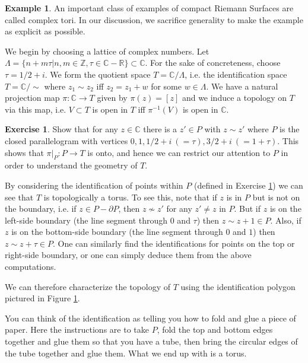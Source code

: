 \documentclass[12pt]{book}%
\theoremstyle{plain}
\theoremstyle{definition}
\newtheorem{example}[theorem]{Example}
\newtheorem{exercise}{Exercise}
\theoremstyle{remark}
\def\to{\rightarrow}
\def\bC{{\mathbb{C}}}
\def\bR{{\mathbb{R}}}
\def\bZ{{\mathbb{Z}}}
\newcommand{\del}{\partial}
\begin{document}
\begin{example}
An important class of examples of compact Riemann Surfaces are called complex tori. In our discussion, we sacrifice generality to make the example as explicit as possible.

We begin by choosing a lattice of complex numbers. Let $\Lambda = \{n+m\tau | n,m \in \bZ, \tau \in \bC-\bR\} \subset \bC$. For the sake of concreteness, choose $\tau = 1/2+i$. We form the quotient space $T=\bC/\Lambda$, i.e. the identification space $T=\bC/\sim$ where $z_1 \sim z_2$ iff $z_2 = z_1 + w$ for some $w\in\Lambda$. We have a natural projection map $\pi:\bC \to T$ given by $\pi(z)=[z]$ and we induce a topology on $T$ via this map, i.e. $V\subset T$ is open in $T$ iff $\pi^{-1}(V)$ is open in $\bC$.

\begin{exercise}
\label{fundamentalRegion}
Show that for any $z\in\bC$ there is a $z'\in P$ with $z \sim z'$ where $P$ is the closed parallelogram with vertices $0, 1, 1/2+i\ (= \tau), 3/2+i\ (= 1 + \tau)$. This shows that $\pi|_P:P \to T$ is onto, and hence we can restrict our attention to $P$ in order to understand the geometry of $T$.
\end{exercise}

By considering the identification of points within $P$ (defined in Exercise \ref{fundamentalRegion}) we can see that $T$ is topologically a torus. To see this, note that if $z$ is in $P$ but is not on the boundary, i.e. if $z\in P-\del P$, then $z \nsim z'$ for any $z'\neq z$ in $P$. But if $z$ is on the left-side boundary (the line segment through $0$ and $\tau$) then $z \sim z+1\in P$. Also, if $z$ is on the bottom-side boundary (the line segment through $0$ and $1$) then $z \sim z+\tau \in P$. One can similarly find the identifications for points on the top or right-side boundary, or one can simply deduce them from the above computations.

We can therefore characterize the topology of $T$ using the  identification polygon pictured in Figure \ref{identPolygonForTorus}.

\begin{figure}
\label{identPolygonForTorus}
\end{figure}

You can think of the identification as telling you how to fold and glue a piece of paper. Here the instructions are to take $P$, fold the top and bottom edges together and glue them so that you have a tube, then bring the circular edges of the tube together and glue them. What we end up with is a torus. 


\end{example}
\end{document}
